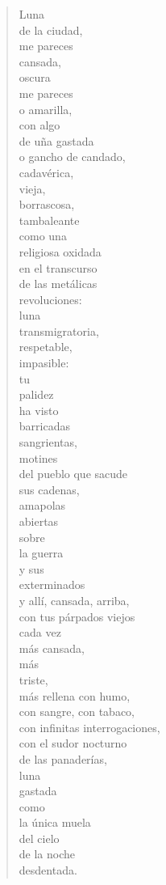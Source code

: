 \documentclass[12pt]{article}
\begin{document}
\clearpage
{}
\begin{verse}

Luna\\
de la ciudad,\\
me pareces\\
cansada,\\
oscura\\
me pareces\\
o amarilla,\\
con algo\\
de uña gastada\\
o gancho de candado,\\
cadavérica,\\
vieja,\\
borrascosa,\\
tambaleante\\
como una\\
religiosa oxidada\\
en el transcurso\\
de las metálicas\\
revoluciones:\\
luna\\
transmigratoria,\\
respetable,\\
impasible:\\
tu\\
palidez\\
ha visto\\
barricadas\\
sangrientas,\\
motines\\
del pueblo que sacude\\
sus cadenas,\\
amapolas\\
abiertas\\
sobre\\
la guerra\\
y sus\\
exterminados\\
y allí, cansada, arriba,\\
con tus párpados viejos\\
cada vez\\
más cansada,\\
más\\
triste,\\
más rellena con humo,\\
con sangre, con tabaco,\\
con infinitas interrogaciones,\\
con el sudor nocturno\\
de las panaderías,\\
luna\\
gastada\\
como\\
la única muela\\
del cielo\\
de la noche\\
desdentada.  


\end{verse}
\end{document}
